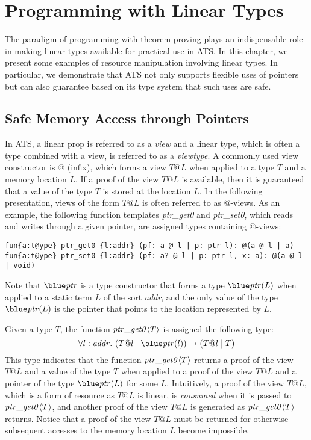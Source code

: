 \chapter{Programming with Linear Types}

The paradigm of programming with theorem proving plays an indispensable
role in making linear types available for practical use in ATS.  In this
chapter, we present some examples of resource manipulation involving linear
types. In particular, we demonstrate that ATS not only supports flexible
uses of pointers but can also guarantee based on its type system that such
uses are safe.

\section{Safe Memory Access through Pointers}
In ATS, a linear prop is referred to as a {\it view} and a linear type,
which is often a type combined with a view, is referred to as a {\it
viewtype}. A commonly used view constructor is $@$ (infix), which forms a
view $T@L$ when applied to a type $T$ and a memory location $L$. If a proof
of the view $T@L$ is available, then it is guaranteed that a value of the
type $T$ is stored at the location $L$. In the following presentation,
views of the form $T@L$ is often referred to as @-views.  As an example,
the following function templates {\it ptr\_get0} and {\it ptr\_set0}, which reads
and writes through a given pointer, are assigned types containing @-views:
\begin{verbatim}
fun{a:t@ype} ptr_get0 {l:addr} (pf: a @ l | p: ptr l): @(a @ l | a)
fun{a:t@ype} ptr_set0 {l:addr} (pf: a? @ l | p: ptr l, x: a): @(a @ l | void)
\end{verbatim}
Note that $\tptr$ is a type constructor that forms a type $\tptr(L)$ when
applied to a static term $L$ of the sort {\it addr}, and the only value of
the type $\tptr(L)$ is the pointer that points to the location represented
by $L$.

Given a type $T$, the function ${\it ptr\_get0}\langle
T\rangle$ is assigned the following type:
\[\forall l:\saddr.~(T @ l \mid \tptr (l))\timp(T@l \mid T)\]
This type indicates that the function ${\it ptr\_get0}\langle T\rangle$
returns a proof of the view $T@L$ and a value of the type $T$ when applied
to a proof of the view $T@L$ and a pointer of the type $\tptr(L)$ for some
$L$. Intuitively, a proof of the view $T@L$, which is a form of resource as
$T@L$ is linear, is {\it consumed} when it is passed to ${\it
ptr\_get0}\langle T\rangle$, and another proof of the view $T@L$ is
generated as ${\it ptr\_get0}\langle T\rangle$ returns. Notice that a proof
of the view $T@L$ must be returned for otherwise subsequent accesses to the
memory location $L$ become impossible.

